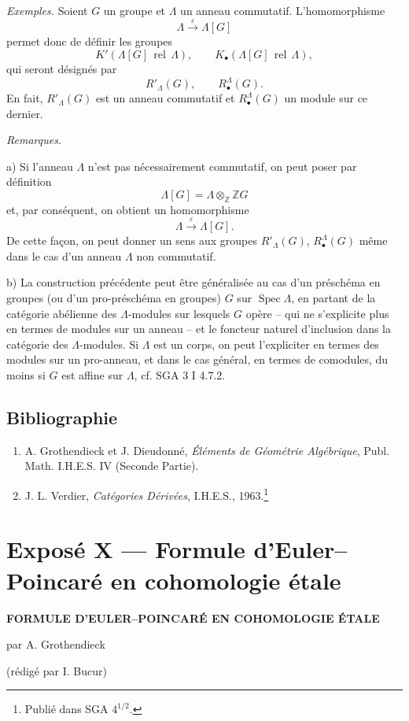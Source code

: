 \documentclass[11pt]{article}
\DeclareMathOperator{\Spec}{Spec}
\providecommand{\Spec}{\operatorname{Spec}}
\providecommand{\Spec}{\operatorname{Spec}}
\begin{document}
\emph{Exemples.} Soient $G$ un groupe et $\Lambda$ un anneau commutatif. L'homomorphisme
\[
\Lambda\xrightarrow{\varepsilon}\Lambda[G]
\]
permet donc de définir les groupes
\[
K'(\Lambda[G]\operatorname{\,rel\,}\Lambda),\qquad
K_\bullet(\Lambda[G]\operatorname{\,rel\,}\Lambda),
\]
qui seront désignés par
\[
R'_\Lambda(G),\qquad R^\Lambda_\bullet(G).
\]
En fait, $R'_\Lambda(G)$ est un anneau commutatif et $R^\Lambda_\bullet(G)$ un module sur ce dernier.

\emph{Remarques.}

a) Si l'anneau $\Lambda$ n'est pas nécessairement commutatif, on peut poser par définition
\[
\Lambda[G]=\Lambda\otimes_{\mathbb Z}\mathbb ZG
\]
et, par conséquent, on obtient un homomorphisme
\[
\Lambda\xrightarrow{\varepsilon}\Lambda[G].
\]
De cette façon, on peut donner un sens aux groupes $R'_\Lambda(G)$, $R^\Lambda_\bullet(G)$ même dans le cas d'un anneau $\Lambda$ non commutatif.

b) La construction précédente peut être généralisée au cas d'un préschéma en groupes (ou d'un pro-préschéma en groupes) $G$ sur $\Spec\Lambda$, en partant de la catégorie abélienne des $\Lambda$-modules sur lesquels $G$ opère -- qui ne s'explicite plus en termes de modules sur un anneau -- et le foncteur naturel d'inclusion dans la catégorie des $\Lambda$-modules. Si $\Lambda$ est un corps, on peut l'expliciter en termes des modules sur un pro-anneau, et dans le cas général, en termes de comodules, du moins si $G$ est affine sur $\Lambda$, cf. SGA 3 I 4.7.2.

\subsection*{Bibliographie}

\begin{enumerate}
\item[{[1]}] A. Grothendieck et J. Dieudonné, \emph{Éléments de Géométrie Algébrique}, Publ. Math. I.H.E.S. IV (Seconde Partie).
\item[{[2]}] J. L. Verdier, \emph{Catégories Dérivées}, I.H.E.S., 1963.\footnote{Publié dans SGA $4^{1/2}$.}
\end{enumerate}

\section*{Exposé X --- Formule d'Euler--Poincaré en cohomologie étale}

\begin{center}
\textbf{FORMULE D'EULER--POINCARÉ EN COHOMOLOGIE ÉTALE}

par A. Grothendieck

(rédigé par I. Bucur)
\end{center}
\end{document}
